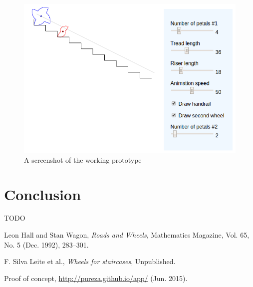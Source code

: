 \documentclass{article}
\theoremstyle{theorem}
\theoremstyle{theorem}
\begin{document}
\begin{figure}[h]
\centering
\includegraphics[width=.9\linewidth]{fig-prototype.png}
\caption{A screenshot of the working prototype}
\label{fig:prototype}
\end{figure}


\section{Conclusion}

TODO

\begin{thebibliography}{10}

Leon Hall and Stan Wagon, {\it Roads and Wheels},
  Mathematics Magazine, Vol. 65, No. 5 (Dec. 1992), 283--301.

F. Silva Leite et al., {\it Wheels for staircases},
  Unpublished.

Proof of concept,
   \url{http://pureza.github.io/app/} (Jun. 2015).

\end{thebibliography}
\end{document}

